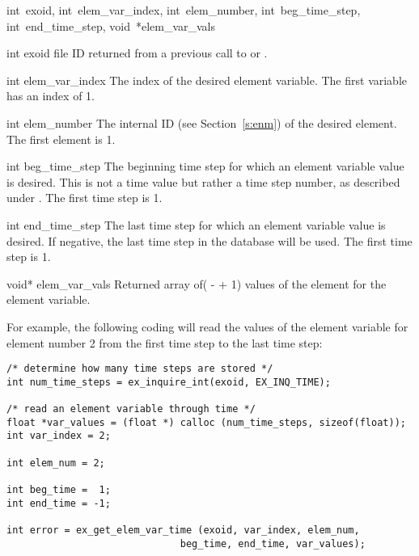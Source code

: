 {int~exoid,
int~elem_var_index,
int~elem_number,
int~beg_time_step,
int~end_time_step,
void~*elem_var_vals}

\begin{parameters}
\item[{int exoid \R{}}]
\exo{} file ID returned from a previous call to 
or .

\item[{int elem_var_index \R{}}]
The index of the desired element variable. The first variable has an
index of 1.

\item[{int elem_number \R{}}]
The internal ID (see Section~\ref{s:enm}) of the desired
element. The first element is 1.

\item[{int beg_time_step \R{}}]
The beginning time step for which an element variable value is
desired. This is not a time value but rather a time step number, as
described under . The first time step is 1.

\item[{int end_time_step \R{}}]
The last time step for which an element variable value is desired. If
negative, the last time step in the database will be used. The first
time step is 1.

\item[{void* elem_var_vals \W{}}]
Returned array of( {-}  +
1) values of the \th{} element for the \th{}
element variable.
\end{parameters}

For example, the following coding will read the values of the
\th{} element variable for element number 2 from the first
time step to the last time step:

\begin{lstlisting}
/* determine how many time steps are stored */
int num_time_steps = ex_inquire_int(exoid, EX_INQ_TIME);

/* read an element variable through time */
float *var_values = (float *) calloc (num_time_steps, sizeof(float));
int var_index = 2;

int elem_num = 2;

int beg_time =  1;
int end_time = -1;

int error = ex_get_elem_var_time (exoid, var_index, elem_num,
                              beg_time, end_time, var_values);
\end{lstlisting}

